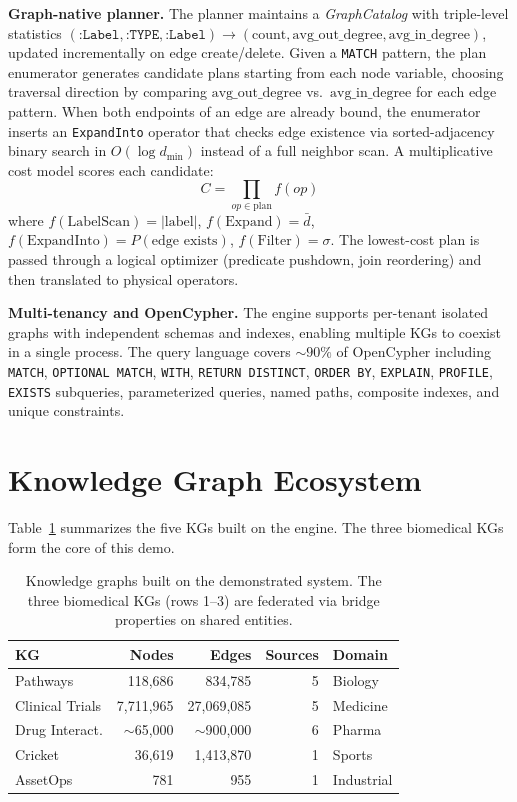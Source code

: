 \documentclass[sigconf, anonymous, review]{acmart}
\begin{document}
\smallskip\noindent\textbf{Graph-native planner.}
The planner maintains a \emph{GraphCatalog} with triple-level statistics
$(\texttt{:Label}, \texttt{:TYPE}, \texttt{:Label}) \to
(\text{count}, \text{avg\_out\_degree}, \text{avg\_in\_degree})$,
updated incrementally on edge create/delete.  Given a \texttt{MATCH}
pattern, the plan enumerator generates candidate plans starting from
each node variable, choosing traversal direction by comparing
$\text{avg\_out\_degree}$ vs.\ $\text{avg\_in\_degree}$ for each edge
pattern.  When both endpoints of an edge are already bound, the
enumerator inserts an \texttt{ExpandInto} operator that checks
edge existence via sorted-adjacency binary search in
$O(\log d_{\min})$ instead of a full neighbor scan.
A multiplicative cost model scores each candidate:
\[
  C = \prod_{op \in \text{plan}} f(op)
\]
where $f(\text{LabelScan}) = |\text{label}|$,
$f(\text{Expand}) = \bar{d}$,
$f(\text{ExpandInto}) = P(\text{edge exists})$,
$f(\text{Filter}) = \sigma$.
The lowest-cost plan is passed through a logical optimizer
(predicate pushdown, join reordering) and then translated to
physical operators.

\smallskip\noindent\textbf{Multi-tenancy and OpenCypher.}
The engine supports per-tenant isolated graphs with independent
schemas and indexes, enabling multiple KGs to coexist in a single
process.  The query language covers ${\sim}90\%$ of OpenCypher
including \texttt{MATCH}, \texttt{OPTIONAL MATCH}, \texttt{WITH},
\texttt{RETURN DISTINCT}, \texttt{ORDER BY}, \texttt{EXPLAIN},
\texttt{PROFILE}, \texttt{EXISTS} subqueries, parameterized queries,
named paths, composite indexes, and unique constraints.

\section{Knowledge Graph Ecosystem}\label{sec:kgs}

Table~\ref{tab:kgs} summarizes the five KGs built on the engine.
The three biomedical KGs form the core of this demo.

\begin{table}[t]
\centering
\caption{Knowledge graphs built on the demonstrated system.
  The three biomedical KGs (rows 1--3) are federated via bridge
  properties on shared entities.}
\label{tab:kgs}
\small
\begin{tabular}{@{}lrrrl@{}}
\toprule
\textbf{KG} & \textbf{Nodes} & \textbf{Edges} & \textbf{Sources} & \textbf{Domain} \\
\midrule
Pathways        & 118,686 &    834,785 &  5 & Biology \\
Clinical Trials & 7,711,965 & 27,069,085 &  5 & Medicine \\
Drug Interact.  & ${\sim}$65,000 & ${\sim}$900,000 &  6 & Pharma \\
\midrule
Cricket         &  36,619 &  1,413,870 &  1 & Sports \\
AssetOps        &     781 &        955 &  1 & Industrial \\
\bottomrule
\end{tabular}
\end{table}
\end{document}
